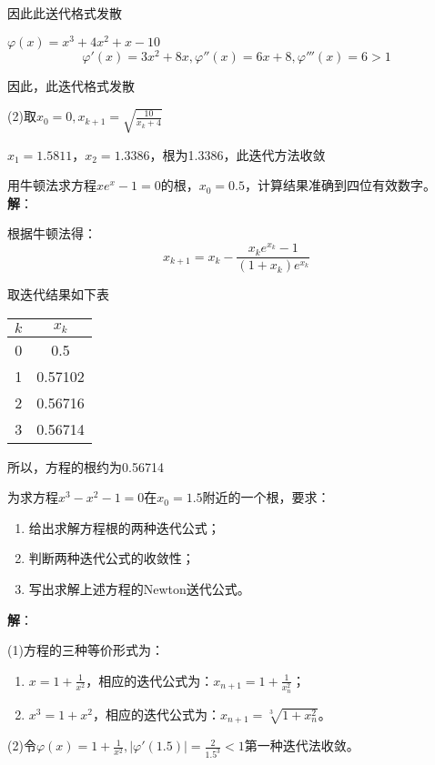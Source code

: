 \documentclass[UTF8,a4paper,11pt,oneside]{ctexbook}
\begin{document}
因此此送代格式发散

\(\varphi(x)=x^3+4x^2+x-10\)
\[
\varphi'(x)=3x^2+8x,\varphi''(x)=6x+8,\varphi'''(x)=6>1
\]

因此，此迭代格式发散

(2)取\(x_0=0,x_{k+1}=\sqrt{\frac{10}{x_k+4}}\)

\(x_1=1.5811\)，\(x_2=1.3386\)，根为1.3386，此迭代方法收敛

\vspace{4em}
用牛顿法求方程\(xe^x-1=0\)的根，\(x_0=0.5\)，计算结果准确到四位有效数字。\\
\textbf{解}：

根据牛顿法得：
\[
x_{k+1}=x_k-\frac{x_ke^{x_k}-1}{(1+x_k)e^{x_k}}
\]

取迭代结果如下表
\begin{center}
    \begin{tabular}{|c|c|}
        \hline
        \(k\) & \(x_k\) \\
        \hline
        0 & 0.5 \\
        \hline
        1 & 0.57102 \\
        \hline
        2 & 0.56716 \\
        \hline
        3 & 0.56714 \\
        \hline
    \end{tabular}
\end{center}

所以，方程的根约为0.56714

\vspace{4em}
为求方程\(x^3-x^2-1=0\)在\(x_0=1.5\)附近的一个根，要求：
\begin{enumerate}
    \item 给出求解方程根的两种迭代公式；
    \item 判断两种迭代公式的收敛性；
    \item 写出求解上述方程的Newton送代公式。
\end{enumerate}
\textbf{解}：

(1)方程的三种等价形式为：
\begin{enumerate}
    \item \(x=1+\frac{1}{x^2}\)，相应的迭代公式为：\(x_{n+1}=1+\frac{1}{x_n^2}\)；
    \item \(x^3=1+x^2\)，相应的迭代公式为：\(x_{n+1}=\sqrt[3]{1+x_n^2}\)。
\end{enumerate}

(2)令\(\varphi(x)=1+\frac{1}{x^2},|\varphi'(1.5)|=\frac{2}{1.5^3}<1\)第一种迭代法收敛。
\end{document}
